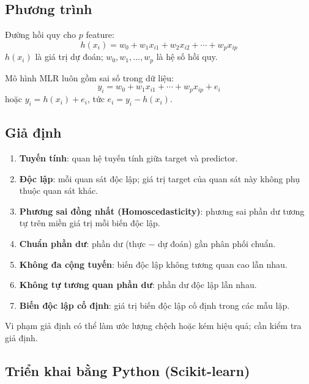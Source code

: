 \subsection{Phương trình}

\begin{dinhnghia}[title={Mô hình với $n$ quan sát, $p$ feature}]
Đường hồi quy cho $p$ feature:
\[
h(x_i) = w_0 + w_1 x_{i1} + w_2 x_{i2} + \cdots + w_p x_{ip}
\]
$h(x_i)$ là giá trị dự đoán; $w_0, w_1, \ldots, w_p$ là hệ số hồi quy.
\end{dinhnghia}

\begin{dinhnghia}[title={Phần dư (residual error)}]
Mô hình MLR luôn gồm sai số trong dữ liệu:
\[
y_i = w_0 + w_1 x_{i1} + \cdots + w_p x_{ip} + e_i
\]
hoặc $y_i = h(x_i) + e_i$, tức $e_i = y_i - h(x_i)$.
\end{dinhnghia}

\subsection{Giả định}

\begin{luuy}[title={Giả định MLR (chi tiết)}]
\begin{enumerate}
  \item \textbf{Tuyến tính}: quan hệ tuyến tính giữa target và predictor.
  \item \textbf{Độc lập}: mỗi quan sát độc lập; giá trị target của quan sát này không phụ thuộc quan sát khác.
  \item \textbf{Phương sai đồng nhất (Homoscedasticity)}: phương sai phần dư tương tự trên miền giá trị mỗi biến độc lập.
  \item \textbf{Chuẩn phần dư}: phần dư (thực $-$ dự đoán) gần phân phối chuẩn.
  \item \textbf{Không đa cộng tuyến}: biến độc lập không tương quan cao lẫn nhau.
  \item \textbf{Không tự tương quan phần dư}: phần dư độc lập lẫn nhau.
  \item \textbf{Biến độc lập cố định}: giá trị biến độc lập cố định trong các mẫu lặp.
\end{enumerate}
Vi phạm giả định có thể làm ước lượng chệch hoặc kém hiệu quả; cần kiểm tra giả định.
\end{luuy}

\subsection{Triển khai bằng Python (Scikit-learn)}

